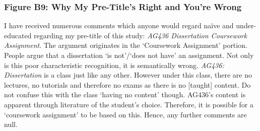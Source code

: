 \documentclass[11pt, english]{article}
\begin{document}
		\subsubsection*{Figure B9: Why My Pre-Title’s Right and You’re Wrong}

		I have received numerous comments which anyone would regard na\"{i}ve and under-educated regarding my pre-title of this study: \textit{AG436 Dissertation Coursework Assignment}. The argument originates in the `Coursework Assignment’ portion. People argue that a dissertation `is not’/`does not have’ an assignment. Not only is this poor characteristic recognition, it is semantically wrong. \textit{AG436: Dissertation} is a class just like any other. However under this class, there are no lectures, no tutorials and therefore no exams as there is no [taught] content. Do not confuse this with the class `having no content’ though. AG436’s content is apparent through literature of the student’s choice. Therefore, it is possible for a `coursework assignment’ to be based on this. Hence, any further comments are null.

\newpage

	\renewcommand\refname{Bibliography}

	\fancyhead[L]{\leftmark} %
\end{document}
